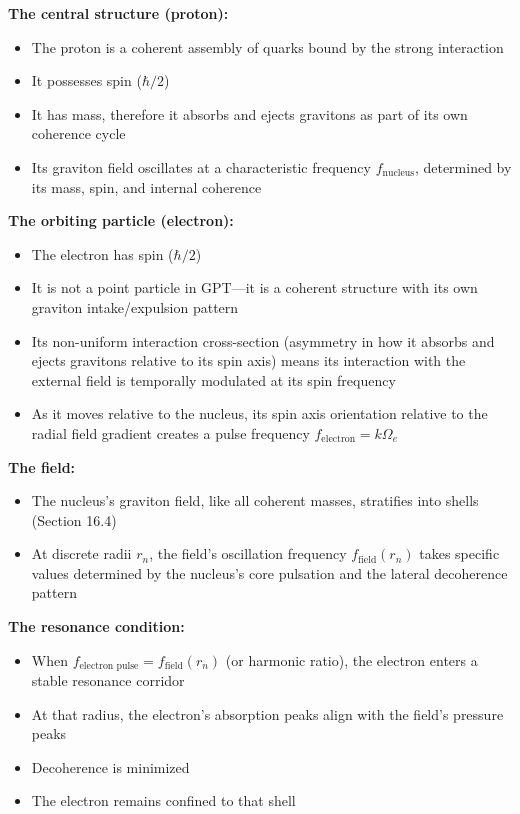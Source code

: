 \documentclass[12pt, a4paper]{article}
\begin{document}
\textbf{The central structure (proton):}
\begin{itemize}
    \item The proton is a coherent assembly of quarks bound by the strong interaction
    \item It possesses spin (\( \hbar/2 \))
    \item It has mass, therefore it absorbs and ejects gravitons as part of its own coherence cycle
    \item Its graviton field oscillates at a characteristic frequency \( f_{\text{nucleus}} \), determined by its mass, spin, and internal coherence
\end{itemize}

\textbf{The orbiting particle (electron):}
\begin{itemize}
    \item The electron has spin (\( \hbar/2 \))
    \item It is not a point particle in GPT—it is a coherent structure with its own graviton intake/expulsion pattern
    \item Its non-uniform interaction cross-section (asymmetry in how it absorbs and ejects gravitons relative to its spin axis) means its interaction with the external field is temporally modulated at its spin frequency
    \item As it moves relative to the nucleus, its spin axis orientation relative to the radial field gradient creates a pulse frequency \( f_{\text{electron}} = k\Omega_e \)
\end{itemize}

\textbf{The field:}
\begin{itemize}
    \item The nucleus's graviton field, like all coherent masses, stratifies into shells (Section 16.4)
    \item At discrete radii \( r_n \), the field's oscillation frequency \( f_{\text{field}}(r_n) \) takes specific values determined by the nucleus's core pulsation and the lateral decoherence pattern
\end{itemize}

\textbf{The resonance condition:}
\begin{itemize}
    \item When \( f_{\text{electron pulse}} = f_{\text{field}}(r_n) \) (or harmonic ratio), the electron enters a stable resonance corridor
    \item At that radius, the electron's absorption peaks align with the field's pressure peaks
    \item Decoherence is minimized
    \item The electron remains confined to that shell
\end{itemize}
\end{document}
